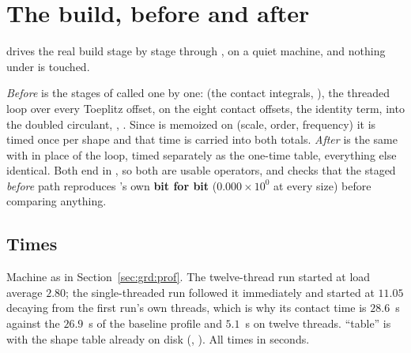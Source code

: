 \section{The build, before and after}
\label{sec:bch}

 drives the real  build stage by stage
through , on a quiet machine, and nothing under
 is touched.

\emph{Before} is the stages of  called one by one:  (the
contact integrals, ), the threaded  loop over every
Toeplitz offset,  on the eight contact offsets, the identity term,
 into the doubled circulant, , . Since
 is memoized on (scale, order, frequency) it is timed once per shape and that
time is carried into both totals. \emph{After} is the same with
 in place of the  loop,  timed
separately as the one-time table, everything else identical. Both end in
, so both are usable operators, and
 checks that the staged \emph{before} path reproduces
's own  \textbf{bit for bit} ($0.000\times10^{0}$ at every
size) before comparing anything.

\subsection{Times}
\label{sec:bch:time}

Machine as in Section~\ref{sec:grd:prof}. The twelve-thread run started at load average
$2.80$; the single-threaded run followed it immediately and started at $11.05$ decaying
from the first run's own threads, which is why its contact time is $28.6$~s against the
$26.9$~s of the baseline profile and $5.1$~s on twelve threads. ``table'' is
 with the shape table already on disk (,
). All times in seconds.

